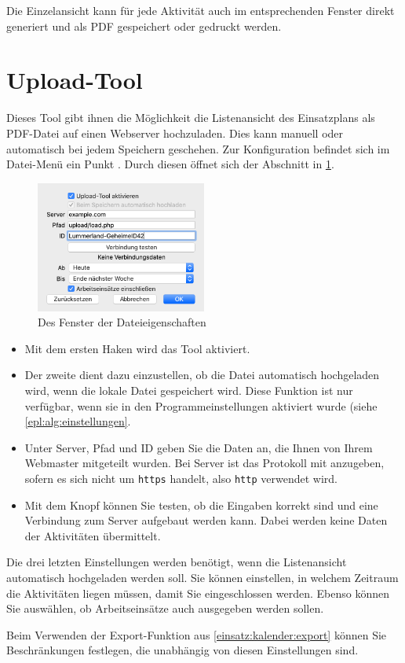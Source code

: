 Die Einzelansicht kann für jede Aktivität auch im entsprechenden Fenster direkt generiert und als PDF gespeichert oder gedruckt werden.




\section{Upload-Tool}\label{einsatz:kalender:upload}
Dieses Tool gibt ihnen die Möglichkeit die Listenansicht des Einsatzplans als PDF-Datei auf einen Webserver hochzuladen.
Dies kann manuell oder automatisch bei jedem Speichern geschehen.
Zur Konfiguration befindet sich im Datei-Menü ein Punkt .
Durch diesen öffnet sich der Abschnitt in \cref{fig:einsatz:kalender:upload}.
\begin{figure}[!h]
  \centering
	\includegraphics[width=0.5\textwidth]{img/eigenschaften_upload}
	\caption{Des Fenster der Dateieigenschaften}
	\label{fig:einsatz:kalender:upload}
\end{figure}
\begin{itemize}
  \item
  Mit dem ersten Haken wird das Tool aktiviert.
  \item
  Der zweite dient dazu einzustellen, ob die Datei automatisch hochgeladen wird, wenn die lokale Datei gespeichert wird.
  Diese Funktion ist nur verfügbar, wenn sie in den Programmeinstellungen aktiviert wurde (siehe \cref{epl:alg:einstellungen}.
  \item
  Unter Server, Pfad und ID geben Sie die Daten an, die Ihnen von Ihrem Webmaster mitgeteilt wurden.
  Bei Server ist das Protokoll mit anzugeben, sofern es sich nicht um \texttt{https} handelt, also \texttt{http} verwendet wird.
  \item
  Mit dem Knopf können Sie testen, ob die Eingaben korrekt sind und eine Verbindung zum Server aufgebaut werden kann.
  Dabei werden keine Daten der Aktivitäten übermittelt.
\end{itemize}
Die drei letzten Einstellungen werden benötigt, wenn die Listenansicht automatisch hochgeladen werden soll.
Sie können einstellen, in welchem Zeitraum die Aktivitäten liegen müssen, damit Sie eingeschlossen werden.
Ebenso können Sie auswählen, ob Arbeitseinsätze auch ausgegeben werden sollen.

\begin{hinweis}
  Beim Verwenden der Export-Funktion aus \cref{einsatz:kalender:export} können Sie Beschränkungen festlegen, die unabhängig von diesen Einstellungen sind.
\end{hinweis}
